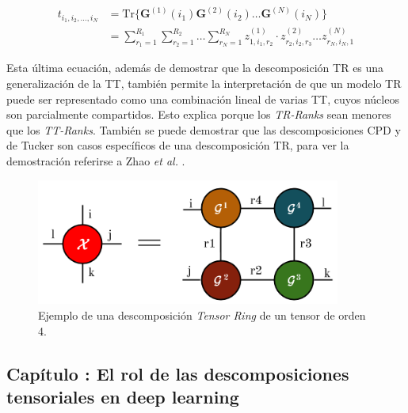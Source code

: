 \documentclass[spanish]{article}
\theoremstyle{definition}
\theoremstyle{remark}
\numberwithin{equation}{section}
\numberwithin{equation}{section} %
\begin{document}
\begin{equation}
\label{TR_shift_theorem_2}
\begin{split}
t_{i_1,i_2, \ldots ,i_N}&
    = \mathrm{Tr} \Big\{\boldsymbol{G}^{(1)}(i_1) \boldsymbol{G}^{(2)}(i_2) \ldots \boldsymbol{G}^{(N)}(i_N) \Big\}   \\
     &
    =\sum^{R_1}_{r_1=1}\sum^{R_2}_{r_2=1}\dots\sum^{R_N}_{r_N=1}z_{1,i_1,r_2}^{(1)} \cdot z_{r_2,i_2,r_3}^{(2)} \ldots z_{r_N,i_N,1}^{(N)}
\end{split}
\end{equation} \par
Esta última ecuación, además de demostrar que la descomposición TR es una generalización de la TT, también permite la interpretación de que un modelo TR puede ser representado como una combinación lineal de varias TT, cuyos núcleos son parcialmente compartidos. Esto explica porque los \textit{TR-Ranks} sean menores que los \textit{TT-Ranks}. También se puede demostrar que las descomposiciones CPD y de Tucker son casos específicos de una descomposición TR, para ver la demostración referirse a Zhao \textit{et al.} \cite{zhao2016tensor}.\par
\begin{figure}[H]
 \centering
 \includegraphics[width=10cm]{img/descomposicion_tensor_ring.png}
\caption[Ejemplo descomposición Tensor Ring]{\footnotesize{Ejemplo de una descomposición \textit{Tensor Ring} de un tensor  de orden 4.
}} 
\label{fig:descomposicion_tr}
\end{figure}
\par
\clearpage
\vspace*{0.25in}
\begin{center}
\begin{LARGE}
\section{Capítulo \thesection:  El rol de las descomposiciones tensoriales en deep learning}
\end{LARGE}
\end{center}
\end{document}
